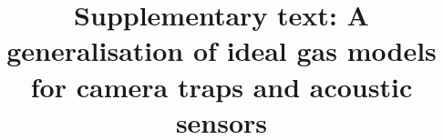 \documentclass[a4paper,10pt,reqno,oneside]{amsart}
\begin{document}
\title[Supp. Text: Gas models.]{Supplementary text: A generalisation of ideal gas models for camera traps and acoustic sensors}
\maketitle

\tableofcontents





\clearpage
	
	
\end{document}
